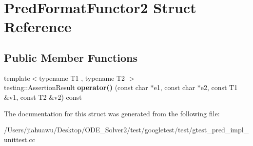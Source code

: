\hypertarget{struct_pred_format_functor2}{}\section{Pred\+Format\+Functor2 Struct Reference}
\label{struct_pred_format_functor2}
\subsection*{Public Member Functions}
\begin{DoxyCompactItemize}
\item 
\mbox{\label{struct_pred_format_functor2_a0169e0105e15d5c63bece2a20646b22b}} 
{\footnotesize template$<$typename T1 , typename T2 $>$ }\\testing\+::\+Assertion\+Result {\bfseries operator()} (const char $\ast$e1, const char $\ast$e2, const T1 \&v1, const T2 \&v2) const
\end{DoxyCompactItemize}


The documentation for this struct was generated from the following file\+:\begin{DoxyCompactItemize}
\item 
/\+Users/jiahuawu/\+Desktop/\+O\+D\+E\+\_\+\+Solver2/test/googletest/test/gtest\+\_\+pred\+\_\+impl\+\_\+unittest.\+cc\end{DoxyCompactItemize}
